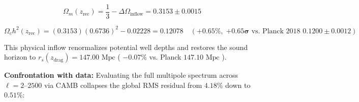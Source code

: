 \documentclass[11pt,a4paper]{article}
\theoremstyle{definition}\newtheorem{definition}{Definition}
\theoremstyle{remark}\newtheorem{remark}{Remark}
\begin{document}
\begin{equation}
\Omega_m(z_{\text{rec}}) = \frac{1}{3} - \Delta \Omega_{\text{inflow}} = 0.3153 \pm 0.0015
\end{equation}



\begin{equation}
\Omega_c h^2(z_{\text{rec}}) = (0.3153)(0.6736)^2 - 0.02228 = \mathbf{0.12078} \quad (\mathbf{+0.65\%}, \; \mathbf{+0.65\sigma} \text{ vs. Planck 2018 } 0.1200 \pm 0.0012)
\end{equation}


This physical inflow renormalizes potential well depths and restores the sound horizon to $r_s(z_{\text{drag}}) = 147.00\text{ Mpc}$ ( $-0.07\%$ vs. Planck $147.10\text{ Mpc}$ ).

\textbf{Confrontation with data:} Evaluating the full multipole spectrum across $\ell = 2\text{--}2500$ via CAMB collapses the global RMS residual from $4.18\%$ down to \textbf{$0.51\%$}:
\end{document}
